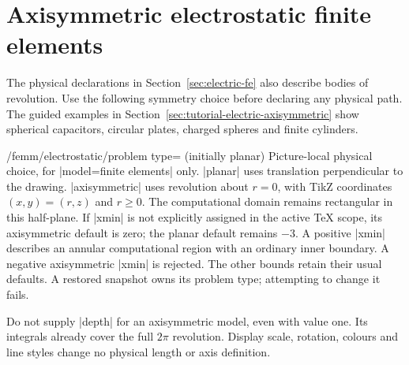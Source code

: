 \section{Axisymmetric electrostatic finite elements}
\label{sec:electric-axisymmetric}

The physical declarations in Section~\ref{sec:electric-fe} also describe
bodies of revolution. Use the following symmetry choice before declaring any
physical path. The guided examples in Section~\ref{sec:tutorial-electric-axisymmetric}
show spherical capacitors, circular plates, charged spheres and finite cylinders.

\begin{key}{/femm/electrostatic/problem type= (initially planar)}
Picture-local physical choice, for |model=finite elements| only.
|planar| uses translation perpendicular to the drawing. |axisymmetric| uses
revolution about $r=0$, with TikZ coordinates $(x,y)=(r,z)$ and $r\geq0$.
The computational domain remains rectangular in this half-plane. If |xmin|
is not explicitly assigned in the active TeX scope, its axisymmetric default
is zero; the planar default remains $-3$. A positive |xmin| describes an
annular computational region with an ordinary inner boundary. A negative
axisymmetric |xmin| is rejected. The other bounds retain their usual defaults.
A restored snapshot owns its problem type; attempting to change it fails.

Do not supply |depth| for an axisymmetric model, even with value one. Its
integrals already cover the full $2\pi$ revolution. Display scale, rotation,
colours and line styles change no physical length or axis definition.
\end{key}

\begin{codeexample}[width=0pt]
\end{codeexample}

